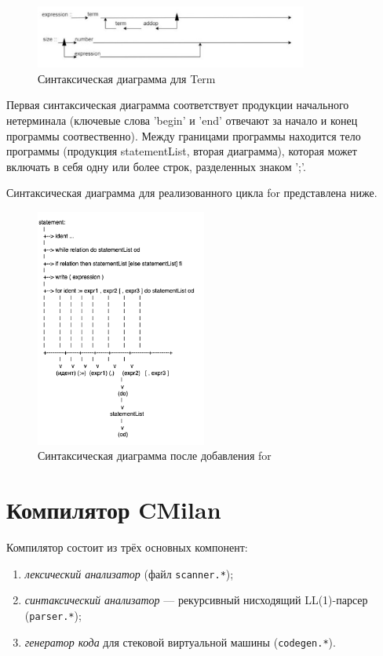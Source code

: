 \documentclass[areasetadvanced]{scrartcl}
\begin{document}
    \begin{figure}[H]
        \centering
        \includegraphics[width=0.8\textwidth]{Term.png}
        \caption{Синтаксическая диаграмма для Term}
    \end{figure}

    Первая синтаксическая диаграмма соответствует продукции начального нетерминала (ключевые слова 'begin' и 'end' отвечают за начало и конец программы соотвественно). Между границами программы находится тело программы (продукция statementList, вторая диаграмма), которая может включать в себя одну или более строк, разделенных знаком ';'.
    
Синтаксическая диаграмма для реализованного цикла for представлена ниже.

\begin{figure}[H]
    \centering
    \includegraphics[width=0.5\textwidth]{diagram2.png}
    \caption{Синтаксическая диаграмма после добавления for}
\end{figure}

    \newpage
    \section{Компилятор \textbf{CMilan}}
    Компилятор состоит из трёх основных компонент:
    \begin{enumerate}
      \item \emph{лексический анализатор} (файл \lstinline{scanner.*});
      \item \emph{синтаксический анализатор} — рекурсивный нисходящий
            LL(1)-парсер (\lstinline{parser.*});
      \item \emph{генератор кода} для стековой виртуальной машины
            (\lstinline{codegen.*}).
    \end{enumerate}
    
\end{document}

